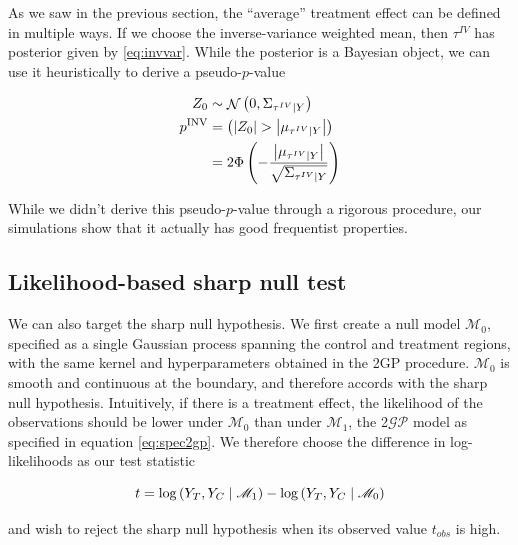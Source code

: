 \documentclass[letter]{article}
\newcommand{\genericdel}[3]{%
      \left#1#3\right#2
    }
\newcommand{\del}[1]{\genericdel(){#1}}
\let\Pr\relax
\DeclareMathOperator{\Pr}{\mathbb{P}}
\DeclareMathOperator{\normal}{\mathcal{N}}
\newcommand{\abs}[1]{\genericdel||{#1}}
\newcommand{\gp}{\mathcal{GP}}
\newcommand{\invvar}{\tau^{IV}}
\newcommand{\modnull}{\mathscr{M}_0}
\newcommand{\modalt}{\mathscr{M}_1}
\begin{document}
As we saw in the previous section, the ``average'' treatment effect can be defined in multiple ways.
If we choose the inverse-variance weighted mean, then \(\invvar\) has posterior given by \eqref{eq:invvar}.
While the posterior is a Bayesian object, we can use it heuristically to derive a pseudo-\(p\)-value

\begin{equation}
\begin{split}
    Z_0 &\sim \normal\del{0, \Sigma_{\invvar \mid Y}}  \\
    p^{\mathrm{INV}} &= \Pr\del{ 
        \abs{Z_0} > 
        \abs{
            \mu_{
                \invvar \mid Y
            }
        } 
    } \\
    &= 2\Phi\del{-
        \frac{
            \abs{
                \mu_{
                    \invvar \mid Y
                }
            }
        }{
            \sqrt{
                \Sigma_{\invvar \mid Y}
            }
        }
    }
\end{split}
\end{equation}

While we didn't derive this pseudo-\(p\)-value through a rigorous procedure, our simulations show that it actually has good frequentist properties.
    


    	\subsection{Likelihood-based sharp null test}\label{likelihood-based-sharp-null-test}

We can also target the sharp null hypothesis.
We first create a null model \(\modnull\),
specified as a single Gaussian process spanning the control and treatment regions,
with the same kernel and hyperparameters obtained in the 2GP procedure.
\(\modnull\) is smooth and continuous at the boundary,
and therefore accords with the sharp null hypothesis.
Intuitively, if there is a treatment effect,
the likelihood of the observations should be lower under \(\modnull\) than under \(\modalt\),
the 2\(\gp\) model as specified in equation \eqref{eq:spec2gp}.
We therefore choose the difference in log-likelihoods as our test statistic

\begin{equation}
    t = \log \Pr\del{Y_T, Y_C \mid \modalt} - \log \Pr\del{Y_T, Y_C \mid \modnull}
\end{equation}

and wish to reject the sharp null hypothesis when its observed value \(t_{obs}\) is high.
\end{document}
